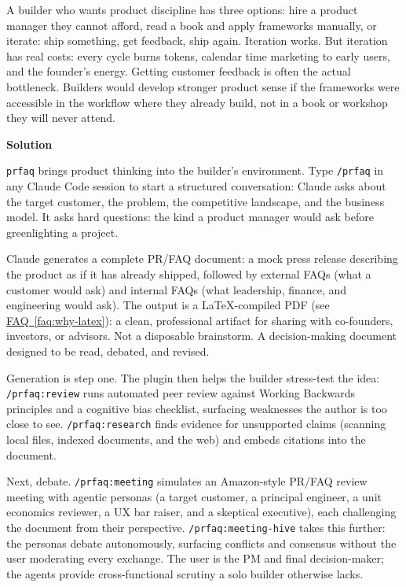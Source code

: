 \documentclass[11pt,letterpaper]{article}
\newcommand{\prsection}[1]{%
  \vspace{1em}%
  {\large\bfseries\color{SectionBlue}#1}%
  \vspace{0.3em}\par%
}
\newcommand{\faqref}[1]{\hyperref[#1]{FAQ~\ref*{#1}}}
\begin{document}
A builder who wants product discipline has three options: hire a product manager they cannot afford, read a book and apply frameworks manually, or iterate: ship something, get feedback, ship again. Iteration works. But iteration has real costs: every cycle burns tokens, calendar time marketing to early users, and the founder's energy. Getting customer feedback is often the actual bottleneck. Builders would develop stronger product sense if the frameworks were accessible in the workflow where they already build, not in a book or workshop they will never attend.

\prsection{Solution}

\texttt{prfaq} brings product thinking into the builder's environment. Type \texttt{/prfaq} in any Claude Code session to start a structured conversation: Claude asks about the target customer, the problem, the competitive landscape, and the business model. It asks hard questions: the kind a product manager would ask before greenlighting a project.

Claude generates a complete PR/FAQ document: a mock press release describing the product as if it has already shipped, followed by external FAQs (what a customer would ask) and internal FAQs (what leadership, finance, and engineering would ask). The output is a LaTeX-compiled PDF (see \faqref{faq:why-latex}): a clean, professional artifact for sharing with co-founders, investors, or advisors. Not a disposable brainstorm. A decision-making document designed to be read, debated, and revised.

Generation is step one. The plugin then helps the builder stress-test the idea: \texttt{/prfaq:review} runs automated peer review against Working Backwards principles and a cognitive bias checklist, surfacing weaknesses the author is too close to see. \texttt{/prfaq:research} finds evidence for unsupported claims (scanning local files, indexed documents, and the web) and embeds citations into the document.

Next, debate. \texttt{/prfaq:meeting} simulates an Amazon-style PR/FAQ review meeting with agentic personas (a target customer, a principal engineer, a unit economics reviewer, a UX bar raiser, and a skeptical executive), each challenging the document from their perspective. \texttt{/prfaq:meeting-hive} takes this further: the personas debate autonomously, surfacing conflicts and consensus without the user moderating every exchange. The user is the PM and final decision-maker; the agents provide cross-functional scrutiny a solo builder otherwise lacks.
\end{document}
